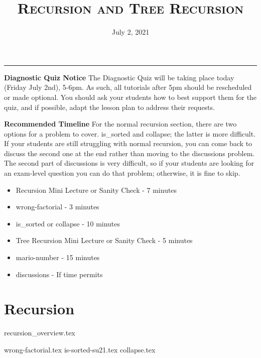 \documentclass{exam}
\title{\textsc{Recursion and Tree Recursion}}
\date{July 2, 2021}
\begin{document}
\maketitle
\rule{\textwidth}{0.15em}
\fontsize{12}{15}\selectfont

\begin{guide}
\textbf{Diagnostic Quiz Notice}
    \newline
    The Diagnostic Quiz will be taking place today (Friday July 2nd), 5-6pm. As such, all tutorials after 5pm should be rescheduled or made optional.
    You should ask your students how to best support them for the quiz, and if possible, adapt the lesson plan to address their requests.
\end{guide}

\begin{guide}
\textbf{Recommended Timeline}
\newline
For the normal recursion section, there are two options for a problem to cover. is\_sorted and collapse; the latter is more difficult.
If your students are still struggling with normal recursion, you can come back to discuss the second one at the end rather than moving
to the discussions problem. The second part of discussions is very difficult, so if your students are looking for an exam-level question
you can do that problem; otherwise, it is fine to skip.
\begin{itemize}
    \item Recursion Mini Lecture or Sanity Check - 7 minutes
    \item wrong-factorial - 3 minutes
    \item is\_sorted or collapse - 10 minutes
    \item Tree Recursion Mini Lecture or Sanity Check - 5 minutes
    \item mario-number - 15 minutes
    \item discussions - If time permits
\end{itemize}
\end{guide}

\section{Recursion}
{recursion_overview.tex}
\begin{questions}
    {wrong-factorial.tex}
    \pagebreak
    {is-sorted-su21.tex}
    {collapse.tex}
\end{questions}
\end{document}
